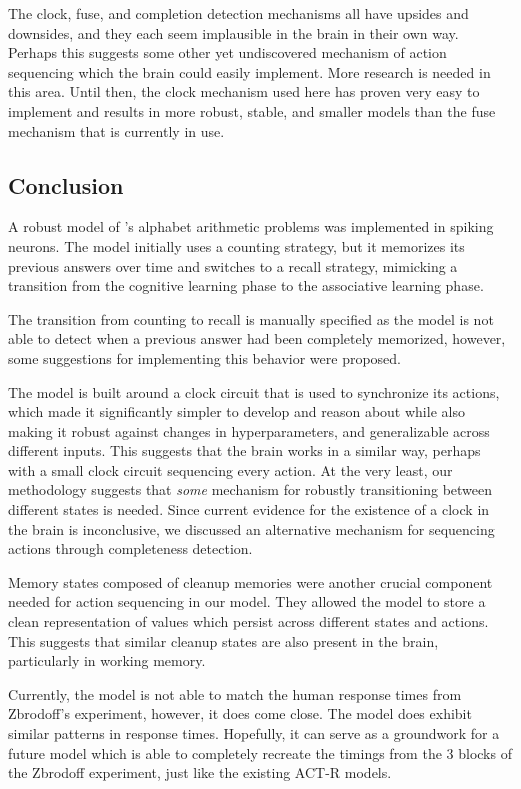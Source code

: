 \documentclass[10pt, a4paper, twocolumn]{article}
\begin{document}
The clock, fuse, and completion detection mechanisms all have upsides and downsides, and they each seem implausible in the brain in their own way. Perhaps this suggests some other yet undiscovered mechanism of action sequencing which the brain could easily implement. More research is needed in this area. Until then, the clock mechanism used here has proven very easy to implement and results in more robust, stable, and smaller models than the fuse mechanism that is currently in use.

\subsection{Conclusion}

A robust model of \citeauthor{Zbrodoff1995}'s alphabet arithmetic problems was implemented in spiking neurons. The model initially uses a counting strategy, but it memorizes its previous answers over time and switches to a recall strategy, mimicking a transition from the cognitive learning phase to the associative learning phase.

The transition from counting to recall is manually specified as the model is not able to detect when a previous answer had been completely memorized, however, some suggestions for implementing this behavior were proposed.

The model is built around a clock circuit that is used to synchronize its actions, which made it significantly simpler to develop and reason about while also making it robust against changes in hyperparameters, and generalizable across different inputs. This suggests that the brain works in a similar way, perhaps with a small clock circuit sequencing every action. At the very least, our methodology suggests that \emph{some} mechanism for robustly transitioning between different states is needed. Since current evidence for the existence of a clock in the brain is inconclusive, we discussed an alternative mechanism for sequencing actions through completeness detection.

Memory states composed of cleanup memories were another crucial component needed for action sequencing in our model. They allowed the model to store a clean representation of values which persist across different states and actions. This suggests that similar cleanup states are also present in the brain, particularly in working memory.

Currently, the model is not able to match the human response times from Zbrodoff's experiment, however, it does come close. The model does exhibit similar patterns in response times. Hopefully, it can serve as a groundwork for a future model which is able to completely recreate the timings from the 3 blocks of the Zbrodoff experiment, just like the existing ACT-R models.



	
\end{document}
